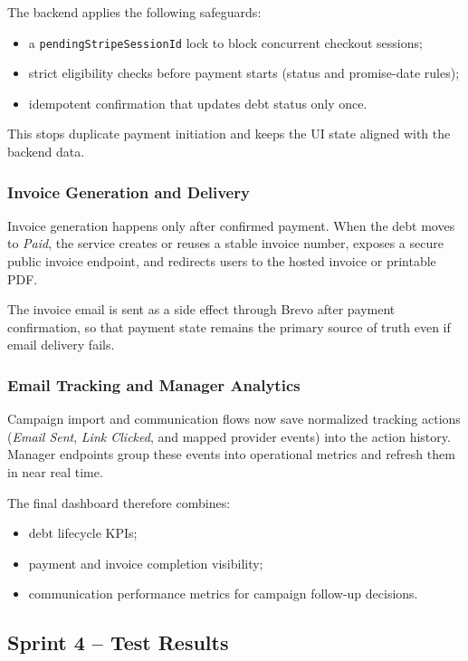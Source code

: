 \documentclass[12pt,a4paper]{report}
\begin{document}
The backend applies the following safeguards:
\begin{itemize}
  \item a \texttt{pendingStripeSessionId} lock to block concurrent checkout
        sessions;
  \item strict eligibility checks before payment starts (status and promise-date
        rules);
  \item idempotent confirmation that updates debt status only once.
\end{itemize}

This stops duplicate payment initiation and keeps the UI state aligned with the
backend data.

\subsubsection{Invoice Generation and Delivery}

Invoice generation happens only after confirmed payment.
When the debt moves to \textit{Paid}, the service creates or reuses a stable
invoice number, exposes a secure public invoice endpoint, and redirects users to
the hosted invoice or printable PDF.

The invoice email is sent as a side effect through Brevo after payment confirmation,
so that payment state remains the primary source of truth even if email delivery
fails.

\subsubsection{Email Tracking and Manager Analytics}

Campaign import and communication flows now save normalized tracking actions
(\textit{Email Sent}, \textit{Link Clicked}, and mapped provider events) into
the action history.
Manager endpoints group these events into operational metrics and refresh them in
near real time.

The final dashboard therefore combines:
\begin{itemize}
  \item debt lifecycle KPIs;
  \item payment and invoice completion visibility;
  \item communication performance metrics for campaign follow-up decisions.
\end{itemize}

\subsection{Sprint 4 -- Test Results}
\end{document}
